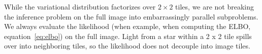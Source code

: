 While the variational distribution factorizes over $2 \times 2$ tiles, we are not breaking the inference problem on the full image into embarrassingly parallel subproblems. We always evaluate the likelihood (when example, when computing the ELBO, equation~\eqref{eq:elbo}) on the full image.
Light from a star within a 2 x 2 tile spills over into neighboring tiles, so the likelihood does not decouple into image tiles. 
